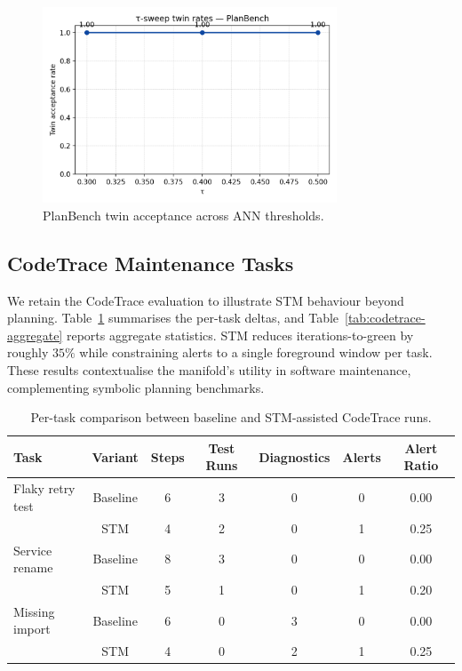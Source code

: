 \documentclass[11pt]{article}
\begin{document}
\begin{figure}[h]
  \centering
  \includegraphics[width=0.78\textwidth]{../note/fig_tau_sweep_planbench.png}
  \caption{PlanBench twin acceptance across ANN thresholds.}
  \label{fig:tau-planbench}
\end{figure}

\subsection{CodeTrace Maintenance Tasks}
We retain the CodeTrace evaluation to illustrate STM behaviour beyond planning.
Table~\ref{tab:codetrace-per-task} summarises the per-task deltas, and
Table~\ref{tab:codetrace-aggregate} reports aggregate statistics. STM reduces
iterations-to-green by roughly $35\%$ while constraining alerts to a single
foreground window per task. These results contextualise the manifold's utility in
software maintenance, complementing symbolic planning benchmarks.

\begin{table}[h]
  \centering
  \caption{Per-task comparison between baseline and STM-assisted CodeTrace runs.}
  \label{tab:codetrace-per-task}
  \begin{tabular}{lcccccc}
    \toprule
    Task & Variant & Steps & Test Runs & Diagnostics & Alerts & Alert Ratio \\
    \midrule
    Flaky retry test & Baseline & 6 & 3 & 0 & 0 & 0.00 \\
                      & STM & 4 & 2 & 0 & 1 & 0.25 \\
    Service rename & Baseline & 8 & 3 & 0 & 0 & 0.00 \\
                   & STM & 5 & 1 & 0 & 1 & 0.20 \\
    Missing import & Baseline & 6 & 0 & 3 & 0 & 0.00 \\
                   & STM & 4 & 0 & 2 & 1 & 0.25 \\
    \bottomrule
  \end{tabular}
\end{table}
\end{document}
